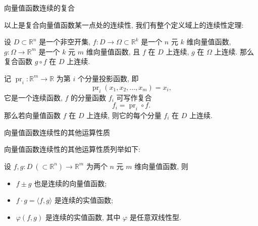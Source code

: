\begin{frame}{向量值函数连续的复合}

以上是复合向量值函数某一点处的连续性, 我们有整个定义域上的连续性定理:

\pause

\begin{thm}
设 $D \subset \mathbb{R}^n$ 是一个非空开集, $f: D \to \Omega \subset \mathbb{R}^k$ 是一个 $n$ 元 $k$ 维向量值函数, $g: \Omega \to \mathbb{R}^m$ 是一个 $k$ 元 $m$ 维向量值函数, 且 $f$ 在 $D$ 上连续, $g$ 在 $\Omega$ 上连续. 那么复合函数 $g \circ f$ 在 $D$ 上连续.
\end{thm}

\pause
\vspace{1em}

记 $\operatorname{pr}_i: \mathbb{R}^m \to \mathbb{R}$ 为第 $i$ 个分量投影函数, 即
\[\operatorname{pr}_i(x_1, x_2, \dots, x_m) = x_i,\]
它是一个连续函数, $f$ 的分量函数 $f_i$ 可写作复合
\[f_i = \operatorname{pr}_i \circ f.\]
那么若向量值函数 $f$ 在 $D$ 上连续, 则它的每个分量 $f_i$ 在 $D$ 上连续.

\end{frame}


\begin{frame}{向量值函数连续性的其他运算性质}

向量值函数连续性的其他运算性质列举如下:

\pause
\vspace{1em}

设 $f, g: D ~ (\subset \mathbb{R}^n) \to \mathbb{R}^m$ 为两个 $n$ 元 $m$ 维向量值函数, 则

\vspace{1em}

\begin{itemize}
\item $f \pm g$ 也是连续的向量值函数;
\item $f \cdot g = \langle f, g \rangle$ 是连续的实值函数;
\item $\varphi(f, g)$ 是连续的实值函数, 其中 $\varphi$ 是任意双线性型.
\end{itemize}

\end{frame}



